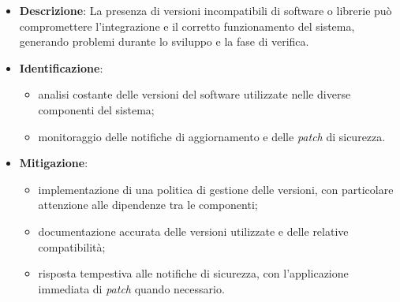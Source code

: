 \label{risk:incompatibilità delle versioni del softwaree}
\begin{itemize}
	\item \textbf{Descrizione}:  La presenza di versioni incompatibili di software o librerie 
								può compromettere l'integrazione e il corretto funzionamento del 
								sistema, generando problemi durante lo sviluppo e la fase di verifica.
	\item \textbf{Identificazione}:
	      \begin{itemize}
		      \item analisi costante delle versioni del software utilizzate nelle diverse componenti del sistema;
		      
			  \item monitoraggio delle notifiche di aggiornamento e delle \textit{patch} di sicurezza.
	      \end{itemize}

	\item \textbf{Mitigazione}:
	      \begin{itemize}
		      \item implementazione di una politica di gestione delle versioni, 
			  		con particolare attenzione alle dipendenze tra le componenti;

		      \item documentazione accurata delle versioni utilizzate e delle relative compatibilità;
		      
			  \item risposta tempestiva alle notifiche di sicurezza, con l'applicazione immediata di \textit{patch} quando necessario.
	      \end{itemize}
\end{itemize}
